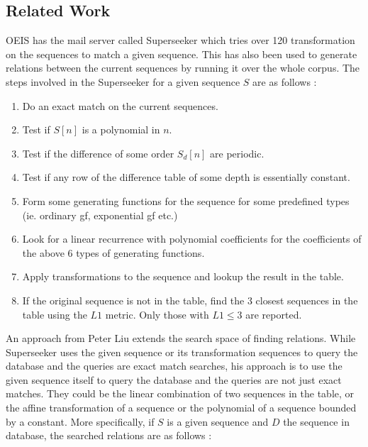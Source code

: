 \begin{appendix}
\section{Related Work} \label{App:AppendixA}
OEIS has the mail server called Superseeker which tries over 120 transformation on the \oeis sequences to match
a given sequence. This has also been used to generate relations between the current sequences by running it over the
whole \oeis corpus. The steps involved in the Superseeker for a given sequence $S$ are as follows \cite{Peter}:

\begin{enumerate}
\item Do an exact match on the current \oeis sequences.
\item Test if $S[n]$ is a polynomial in $n$.
\item Test if the difference of some order ${S_d[n]}$ are periodic.
\item Test if any row of the difference table of some depth is essentially constant.
\item Form some generating functions for the sequence for some predefined types (ie. ordinary gf, exponential gf etc.)
\item Look for a linear recurrence with polynomial coefficients for the coefficients of the above 6 types of
generating functions.
\item Apply transformations to the sequence and lookup the result in the table.
\item If the original sequence is not in the table, find the 3 closest sequences in the table using the $L1$ metric.
Only those with $L1 \leq 3$ are reported.

\end{enumerate}

An approach from Peter Liu \cite{Peter} extends the search space of finding relations. While Superseeker uses the
given sequence or its transformation sequences to query the database and the queries are exact match searches, his
approach is to use the given sequence itself to query the database and the queries are not just exact matches. They
could be the linear combination of two sequences in the table, or the affine transformation of a sequence or the
polynomial of a sequence bounded by a constant. More specifically, if $S$ is a given sequence and $D$ the sequence in
 database, the searched relations are as follows \cite{Peter}:


\end{appendix}
